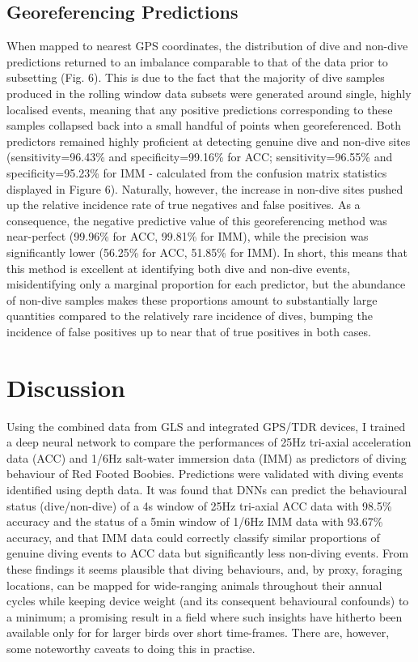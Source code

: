 \documentclass[11pt]{article}
\begin{document}
    \subsection{Georeferencing Predictions}
    When mapped to nearest GPS coordinates, the distribution of dive and non-dive predictions returned to an imbalance comparable to that of the data prior to subsetting (Fig. 6). This is due to the fact that the majority of dive samples produced in the rolling window data subsets were generated around single, highly localised events, meaning that any positive predictions corresponding to these samples collapsed back into a small handful of points when georeferenced. Both predictors remained highly proficient at detecting genuine dive and non-dive sites (sensitivity=96.43\% and specificity=99.16\% for ACC; sensitivity=96.55\% and specificity=95.23\% for IMM - calculated from the confusion matrix statistics displayed in Figure 6). Naturally, however, the increase in non-dive sites pushed up the relative incidence rate of true negatives and false positives. As a consequence, the negative predictive value of this georeferencing method was near-perfect (99.96\% for ACC, 99.81\% for IMM), while the precision was significantly lower (56.25\% for ACC, 51.85\% for IMM). In short, this means that this method is excellent at identifying both dive and non-dive events, misidentifying only a marginal proportion for each predictor, but the abundance of non-dive samples makes these proportions amount to substantially large quantities compared to the relatively rare incidence of dives, bumping the incidence of false positives up to near that of true positives in both cases. 
    
    
    \section{Discussion}
    Using the combined data from GLS and integrated GPS/TDR devices, I trained a deep neural network to compare the performances of 25Hz tri-axial acceleration data (ACC) and 1/6Hz salt-water immersion data (IMM) as predictors of diving behaviour of Red Footed Boobies. Predictions were validated with diving events identified using depth data. It was found that DNNs can predict the behavioural status (dive/non-dive) of a 4s window of 25Hz tri-axial ACC data with 98.5\% accuracy and the status of a 5min window of 1/6Hz IMM data with 93.67\% accuracy, and that IMM data could correctly classify similar proportions of genuine diving events to ACC data but significantly less non-diving events. From these findings it seems plausible that diving behaviours, and, by proxy, foraging locations, can be mapped for wide-ranging animals throughout their annual cycles while keeping device weight (and its consequent behavioural confounds) to a minimum; a promising result in a field where such insights have hitherto been available only for for larger birds over short time-frames. There are, however, some noteworthy caveats to doing this in practise.
    
\end{document}
